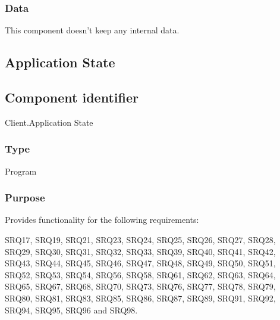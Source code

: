 \subsubsection*{Data}
This component doesn't keep any internal data.

\subsection{Application State}
\label{subsec:appstate}

\subsection*{Component identifier}
Client.Application State

\subsubsection*{Type}
Program

\subsubsection*{Purpose}
Provides functionality for the following requirements:

\noindent{} SRQ17, SRQ19, SRQ21, SRQ23, SRQ24, SRQ25, SRQ26, SRQ27, SRQ28, SRQ29, SRQ30, SRQ31, SRQ32, SRQ33, SRQ39, SRQ40, SRQ41, SRQ42, SRQ43, SRQ44, SRQ45, SRQ46, SRQ47, SRQ48, SRQ49, SRQ50, SRQ51, SRQ52, SRQ53, SRQ54, SRQ56, SRQ58, SRQ61, SRQ62, SRQ63, SRQ64, SRQ65, SRQ67, SRQ68, SRQ70, SRQ73, SRQ76, SRQ77, SRQ78, SRQ79, SRQ80, SRQ81, SRQ83, SRQ85, SRQ86, SRQ87, SRQ89, SRQ91, SRQ92, SRQ94, SRQ95, SRQ96 and SRQ98.


